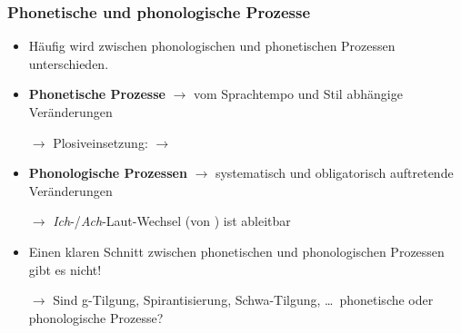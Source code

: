 \begin{frame}%
\frametitle{Phonetische und phonologische Prozesse}

\begin{itemize}
	\item Häufig wird zwischen phonologischen und phonetischen Prozessen unterschieden.
	\item[]
	\item \textbf{Phonetische Prozesse} $\rightarrow$ vom Sprachtempo und Stil abhängige Veränderungen
	\item[$\rightarrow$] Plosiveinsetzung:  $\rightarrow$ \textipa{[P a m p t]}
	\item[]
	\item \textbf{Phonologische Prozessen} $\rightarrow$ systematisch und obligatorisch auftretende Veränderungen
	\item[$\rightarrow$] \textit{Ich}-/\textit{Ach}-Laut-Wechsel \textipa{[b u: x]} (von ) ist ableitbar
	\item[]
	\item Einen klaren Schnitt zwischen phonetischen und phonologischen Prozessen gibt es nicht!
	\item[$\rightarrow$] Sind g-Tilgung, Spirantisierung, Schwa-Tilgung, \dots\ phonetische oder phonologische Prozesse?
\end{itemize}

\end{frame}




